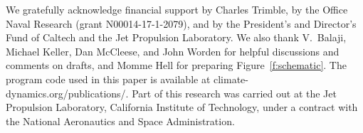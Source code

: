 \documentclass[draft]{agujournal}
\begin{document}
%
%
%
%
%
%
%


\acknowledgments
We gratefully acknowledge financial support by Charles Trimble, by the Office Naval Research (grant N00014-17-1-2079), and by the President's and Director's Fund of Caltech and the Jet Propulsion Laboratory. We also thank V.\ Balaji, Michael Keller, Dan McCleese, and John Worden for helpful discussions and comments on drafts, and Momme Hell for preparing Figure~\ref{f:schematic}. The program code used in this paper is available at climate-dynamics.org/publications/. Part of this research was carried out at the Jet Propulsion Laboratory, California Institute of Technology, under a contract with the National Aeronautics and Space Administration.

%
%
\end{document}
